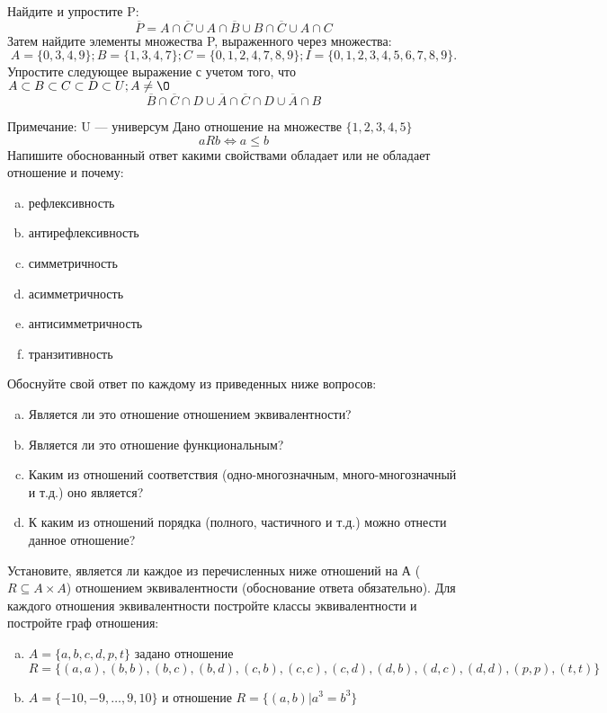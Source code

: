 \documentclass[10pt]{exam}
\begin{document}
\begin{questions}
\question
Найдите и упростите P:
\begin{equation*}
\overline{P} = A \cap \overline{C} \cup A \cap \overline{B} \cup B \cap \overline{C} \cup A \cap C
\end{equation*}
Затем найдите элементы множества P, выраженного через множества:
\begin{equation*}
A = \{0, 3, 4, 9\}; 
B = \{1, 3, 4, 7\};
C = \{0, 1, 2, 4, 7, 8, 9\};
I = \{0, 1, 2, 3, 4, 5, 6, 7, 8, 9\}.
\end{equation*}\question
Упростите следующее выражение с учетом того, что $A\subset B \subset C \subset D \subset U; A \neq \O$
\begin{equation*}
\overline{B} \cap \overline{C} \cap D \cup \overline{A} \cap \overline{C} \cap D \cup \overline{A} \cap B
\end{equation*}

Примечание: U — универсум\question
Дано отношение на множестве $\{1, 2, 3, 4, 5\}$ 
\begin{equation*}
aRb \iff a \leq b
\end{equation*}
Напишите обоснованный ответ какими свойствами обладает или не обладает отношение и почему:   
\begin{enumerate} [a)]\setcounter{enumi}{0}
\item рефлексивность
\item антирефлексивность
\item симметричность
\item асимметричность
\item антисимметричность
\item транзитивность
\end{enumerate}

Обоснуйте свой ответ по каждому из приведенных ниже вопросов:
\begin{enumerate} [a)]\setcounter{enumi}{0}
    \item Является ли это отношение отношением эквивалентности?
    \item Является ли это отношение функциональным?
    \item Каким из отношений соответствия (одно-многозначным, много-многозначный и т.д.) оно является?
    \item К каким из отношений порядка (полного, частичного и т.д.) можно отнести данное отношение?
\end{enumerate}


\question
Установите, является ли каждое из перечисленных ниже отношений на А ($R \subseteq A \times A$) отношением эквивалентности (обоснование ответа обязательно). Для каждого отношения эквивалентности постройте классы 
эквивалентности и постройте граф отношения:
\begin{enumerate} [a)]\setcounter{enumi}{0}
\item $A = \{a, b, c, d, p, t\}$ задано отношение $R = \{(a, a), (b, b), (b, c), (b, d), (c, b), (c, c), (c, d), (d, b), (d, c), (d, d), (p,p), (t,t)\}$
\item $A = \{-10, -9, … , 9, 10\}$ и отношение $R = \{(a,b)|a^{3} = b^{3}\}$


\end{enumerate}
\end{questions}
\end{document}
